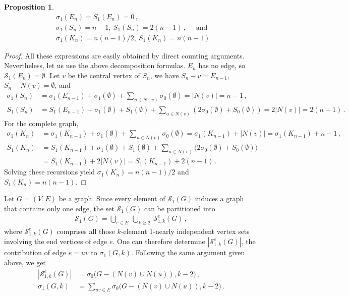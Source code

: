\documentclass[a4paper,12pt]{amsart}
\newtheorem{proposition}[lemma]{Proposition}
\theoremstyle{remark}
\begin{document}
\begin{proposition}\label{Prop:Few} 
\begin{align*}
&\sigma_1(E_n)=S_1(E_n)=0\,,\\
&\sigma_1(S_n)=n-1,~ S_1(S_n)=2(n-1)\,, \quad \text{ and }\\
&\sigma_1(K_n)=n(n-1)/2, ~S_1(K_n)=n(n-1).
\end{align*}

\end{proposition}

\begin{proof}
All these expressions are easily obtained by direct counting arguments. Nevertheless, let us use the above decomposition formulas. $E_n$ has no edge, so $\mathcal{S}_1(E_n)=\emptyset$. Let $v$ be the central vertex of $S_n$, we have $S_n-v=E_{n-1}$, $S_n-N(v)=\emptyset$, and
\begin{align*}
\sigma_1(S_n)&=\sigma_1(E_{n-1})+\sigma_1(\emptyset)+\sum_{u\in N(v)}\sigma_0(\emptyset) =|N(v)|=n-1\,,\\
S_1(S_n)&=S_1(E_{n-1})+\sigma_1(\emptyset)+ S_1(\emptyset)+\sum_{u\in N(v)}(2\sigma_0(\emptyset)+S_0(\emptyset)) =2|N(v)|=2(n-1)\,.
\end{align*}
For the complete graph,
\begin{align*}
\sigma_1(K_n)&=\sigma_1(K_{n-1})+\sigma_1(\emptyset) + \sum_{u\in N(v)}\sigma_0(\emptyset)=\sigma_1(K_{n-1})+ |N(v)|=\sigma_1(K_{n-1})+ n-1\,,\\
S_1(K_n)&=S_1(K_{n-1})+\sigma_1(\emptyset) + S_1(\emptyset) + \sum_{u\in N(v)}\big( 2\sigma_0 (\emptyset) + S_0(\emptyset) \big)\\
&= S_1(K_{n-1})+ 2|N(v)|=S_1(K_{n-1})+2(n-1)\,.
\end{align*}
Solving these recursions yield $\sigma_1(K_n)=n(n-1)/2$ and $S_1(K_n)=n(n-1)$.
\end{proof}

\medskip
Let $G=(V,E)$ be a graph. Since every element of $\mathcal{S}_1(G)$ induces a graph that contains only one edge, the set $\mathcal{S}_1(G)$ can be partitioned into 
\begin{align*}
\mathcal{S}_1(G)=\bigcup_{e\in E}~ \bigcup_{k\geq 2}~ \mathcal{S}^{e}_{1,k}(G)\,,
\end{align*}
where $\mathcal{S}^{e}_{1,k}(G)$ comprises all those $k$-element $1$-nearly independent vertex sets involving the end vertices of edge $e$. One can therefore determine $|\mathcal{S}^{e}_{1,k}(G)|$, the contribution of edge $e=uv$ to $\sigma_1(G,k)$. Following the same argument given above, we get
\begin{align*}
|\mathcal{S}^{e}_{1,k}(G)|&=\sigma_0\big(G-(N(v) \cup N(u)), k-2 \big)\,,\\
\sigma_1(G,k)&=\sum_{uv\in E} \sigma_0\big(G-(N(v) \cup N(u)), k-2 \big)\,.
\end{align*}
\end{document}
